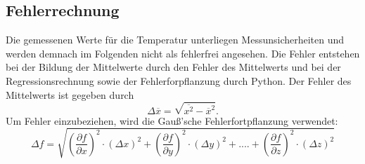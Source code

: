 \subsection{Fehlerrechnung}
Die gemessenen Werte für die Temperatur unterliegen 
Messunsicherheiten und werden demnach im Folgenden nicht als fehlerfrei 
angesehen. Die Fehler entstehen bei der Bildung der Mittelwerte durch den 
Fehler des Mittelwerts und bei der Regressionsrechnung sowie der Fehlerforpflanzung 
durch Python. Der Fehler des Mittelwerts ist gegeben durch 
\begin{equation}
    \label{eqn:7}
    \Delta \overline{x} = \sqrt{\overline{x^2} - \overline{x}^2}.
\end{equation}
Um Fehler einzubeziehen, wird die Gauß'sche Fehlerfortpflanzung verwendet:
\begin{equation}
    \label{eqn:8}
    \Delta f = \sqrt{\left(\frac{\partial f}{\partial x}\right)^2 \cdot \left(\Delta x\right)^2 + \left(\frac{\partial f}{\partial y}\right)^2 \cdot \left(\Delta y\right)^2 + .... + \left(\frac{\partial f}{\partial z}\right)^2 \cdot \left(\Delta z\right)^2}
\end{equation}